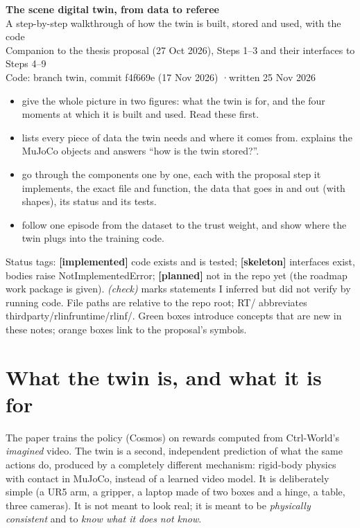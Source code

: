 \documentclass[11pt,a4paper]{article}
\newcommand{\done}{\textcolor{okgreen}{\textbf{[implemented]}}}
\newcommand{\skel}{\textcolor{skelamber}{\textbf{[skeleton]}}}
\newcommand{\planned}{\textcolor{plangray}{\textbf{[planned]}}}
\newcommand{\chk}{\textit{(check)}}
\newcommand{\code}[1]{{\small\ttfamily\begingroup\def\_{\textunderscore\allowbreak}\def\/{/\allowbreak}#1\endgroup}}
\begin{document}
\begin{center}
{\LARGE\bfseries\color{navy} The scene digital twin, from data to referee}\\[6pt]
{\large\color{navy} A step-by-step walkthrough of how the twin is built, stored and used, with the code}\\[8pt]
{\color{gray} Companion to the thesis proposal (27 Oct 2026), Steps 1--3 and their interfaces to Steps 4--9\\
Code: branch \code{twin}, commit \code{f4f669e} (17 Nov 2026) \quad·\quad written 25 Nov 2026}
\end{center}

\begin{keybox}[title={\textbf{How to read this document}},fonttitle=\color{white}\bfseries,colbacktitle=blue!60!black]
\begin{itemize}[leftmargin=1.2em]
\item {} give the whole picture in two figures: what the twin is for, and the four moments at which it is built and used. Read these first.
\item {} lists every piece of data the twin needs and where it comes from.  explains the MuJoCo objects and answers ``how is the twin stored?''.
\item {} go through the components one by one, each with the proposal step it implements, the exact file and function, the data that goes in and out (with shapes), its status and its tests.
\item {} follow one episode from the dataset to the trust weight, and show where the twin plugs into the training code.
\end{itemize}
Status tags: \done{} code exists and is tested; \skel{} interfaces exist, bodies raise \code{NotImplementedError}; \planned{} not in the repo yet (the roadmap work package is given). \chk{} marks statements I inferred but did not verify by running code. File paths are relative to the repo root; \code{RT/} abbreviates \code{third\_party\/rlinf\_runtime\/rlinf\/}. Green boxes introduce concepts that are new in these notes; orange boxes link to the proposal's symbols.
\end{keybox}

\tableofcontents
\newpage

\section{What the twin is, and what it is for}\label{sec:what}
The paper trains the policy (Cosmos) on rewards computed from Ctrl-World's \emph{imagined} video. The twin is a second, independent prediction of what the same actions do, produced by a completely different mechanism: rigid-body physics with contact in MuJoCo, instead of a learned video model. It is deliberately simple (a UR5 arm, a gripper, a laptop made of two boxes and a hinge, a table, three cameras). It is not meant to look real; it is meant to be \emph{physically consistent} and to \emph{know what it does not know}.
\end{document}
